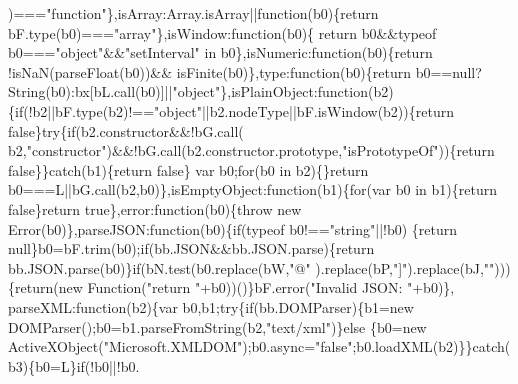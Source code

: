 \begin{DoxyCode}
      )===\textcolor{stringliteral}{"function"}\},isArray:Array.isArray||\textcolor{keyword}{function}(b0)\{\textcolor{keywordflow}{return} bF.type(b0)===\textcolor{stringliteral}{"array"}\},isWindow:\textcolor{keyword}{function}(b0)\{\textcolor{keywordflow}{
      return} b0&&typeof b0===\textcolor{stringliteral}{"object"}&&\textcolor{stringliteral}{"setInterval"} in b0\},isNumeric:\textcolor{keyword}{function}(b0)\{\textcolor{keywordflow}{return} !isNaN(parseFloat(b0))&&
      isFinite(b0)\},type:\textcolor{keyword}{function}(b0)\{\textcolor{keywordflow}{return} b0==null?String(b0):bx[bL.call(b0)]||\textcolor{stringliteral}{"object"}\},isPlainObject:function(b2)
      \{\textcolor{keywordflow}{if}(!b2||bF.type(b2)!==\textcolor{stringliteral}{"object"}||b2.nodeType||bF.isWindow(b2))\{\textcolor{keywordflow}{return} \textcolor{keyword}{false}\}\textcolor{keywordflow}{try}\{\textcolor{keywordflow}{if}(b2.constructor&&!bG.call(
      b2,\textcolor{stringliteral}{"constructor"})&&!bG.call(b2.constructor.prototype,\textcolor{stringliteral}{"isPrototypeOf"}))\{\textcolor{keywordflow}{return} \textcolor{keyword}{false}\}\}\textcolor{keywordflow}{catch}(b1)\{\textcolor{keywordflow}{return} \textcolor{keyword}{false}\}
      var b0;\textcolor{keywordflow}{for}(b0 in b2)\{\}\textcolor{keywordflow}{return} b0===L||bG.call(b2,b0)\},isEmptyObject:\textcolor{keyword}{function}(b1)\{\textcolor{keywordflow}{for}(var b0 in b1)\{\textcolor{keywordflow}{return} \textcolor{keyword}{
      false}\}\textcolor{keywordflow}{return} \textcolor{keyword}{true}\},error:\textcolor{keyword}{function}(b0)\{\textcolor{keywordflow}{throw} \textcolor{keyword}{new} Error(b0)\},parseJSON:\textcolor{keyword}{function}(b0)\{\textcolor{keywordflow}{if}(typeof b0!==\textcolor{stringliteral}{"string"}||!b0)
      \{\textcolor{keywordflow}{return} null\}b0=bF.trim(b0);\textcolor{keywordflow}{if}(bb.JSON&&bb.JSON.parse)\{\textcolor{keywordflow}{return} bb.JSON.parse(b0)\}\textcolor{keywordflow}{if}(bN.test(b0.replace(bW,\textcolor{stringliteral}{"@"}
      ).replace(bP,\textcolor{stringliteral}{"]"}).replace(bJ,\textcolor{stringliteral}{""})))\{\textcolor{keywordflow}{return}(\textcolor{keyword}{new} Function(\textcolor{stringliteral}{"return "}+b0))()\}bF.error(\textcolor{stringliteral}{"Invalid JSON: "}+b0)\},
      parseXML:\textcolor{keyword}{function}(b2)\{var b0,b1;\textcolor{keywordflow}{try}\{\textcolor{keywordflow}{if}(bb.DOMParser)\{b1=\textcolor{keyword}{new} DOMParser();b0=b1.parseFromString(b2,\textcolor{stringliteral}{"text/xml"})\}\textcolor{keywordflow}{else}
      \{b0=\textcolor{keyword}{new} ActiveXObject(\textcolor{stringliteral}{"Microsoft.XMLDOM"});b0.async=\textcolor{stringliteral}{"false"};b0.loadXML(b2)\}\}\textcolor{keywordflow}{catch}(b3)\{b0=L\}\textcolor{keywordflow}{if}(!b0||!b0.

\end{DoxyCode}
